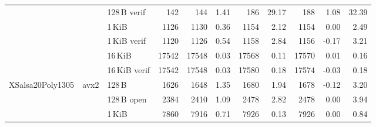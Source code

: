\begin{table}[H]
\begin{tabular}{lllrrrrrrrr}
 &      & 128\,B verif  & 142
                        & 144
                        & 1.41
                        & 186
                        & 29.17
                        & 188
                        & 1.08
                        & 32.39 \\

 &      & 1\,KiB        & 1126
                        & 1130
                        & 0.36
                        & 1154
                        & 2.12
                        & 1154
                        & 0.00
                        & 2.49 \\

 &      & 1\,KiB verif  & 1120
                        & 1126
                        & 0.54
                        & 1158
                        & 2.84
                        & 1156
                        & -0.17
                        & 3.21 \\

 &      & 16\,KiB       & 17542
                        & 17548
                        & 0.03
                        & 17568
                        & 0.11
                        & 17570
                        & 0.01
                        & 0.16 \\

 &      & 16\,KiB verif & 17542
                        & 17548
                        & 0.03
                        & 17580
                        & 0.18
                        & 17574
                        & -0.03
                        & 0.18 \\

      \midrule
    \multirow{8}{*}{XSalsa20Poly1305}
 &  \multirow{6}{*}{avx2}
        & 128\,B        & 1626
                        & 1648
                        & 1.35
                        & 1680
                        & 1.94
                        & 1678
                        & -0.12
                        & 3.20 \\

 &      & 128\,B open   & 2384
                        & 2410
                        & 1.09
                        & 2478
                        & 2.82
                        & 2478
                        & 0.00
                        & 3.94 \\

 &      & 1\,KiB        & 7860
                        & 7916
                        & 0.71
                        & 7926
                        & 0.13
                        & 7926
                        & 0.00
                        & 0.84 \\


\end{tabular}
\end{table}
